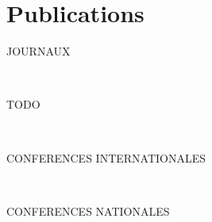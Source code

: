 \chapter*{Publications}


\begin{refsection}[ownpubs]

    \noindent JOURNAUX
    \small
    
    \

    TODO

    \printbibliography[keyword=journal, heading=none]

    \

    \noindent CONFERENCES INTERNATIONALES
    \small
    \nocite{soule2024marl}
    \nocite{soulej2023sim}
    \printbibliography[keyword=international, heading=none]

    \

    \noindent CONFERENCES NATIONALES
    \nocite{soule2023jfsmathese}
    \nocite{soule2023ressithese}
    \nocite{soule2023rjciathese}
    \nocite{soule2024outil}
    \nocite{soule2024approche}
    \printbibliography[keyword=national, heading=none]

\end{refsection}
